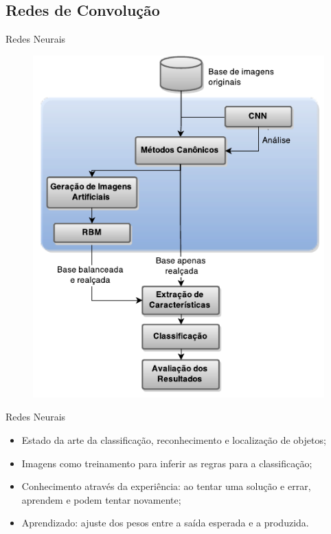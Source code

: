 \documentclass{beamer}
\begin{document}
\subsection{Redes de Convolução}
\begin{frame}{Redes Neurais}
\begin{figure}
    \includegraphics[height=0.75\textheight]{figuras/geral.pdf}
\end{figure}
\end{frame}
\begin{frame}{Redes Neurais}
\setlength\leftmargini{0em}
\justifying
  \begin{itemize}
  \item Estado da arte da classificação, reconhecimento e localização de objetos;
  \item Imagens como treinamento para inferir as regras para a classificação;
  \item Conhecimento através da experiência: ao tentar uma solução e errar, aprendem e podem tentar novamente;
  \item Aprendizado: ajuste dos pesos entre a saída esperada e a produzida.
  \end{itemize}
\end{frame}
\end{document}
